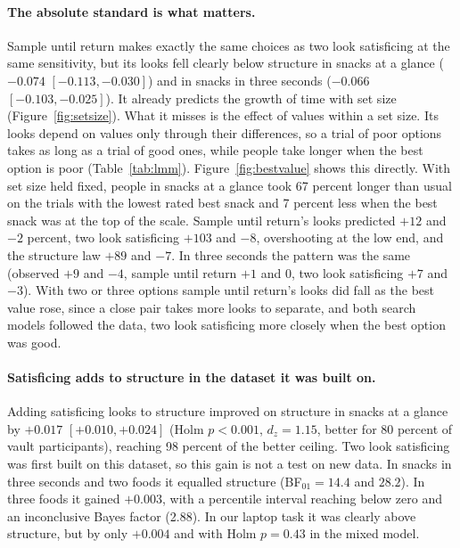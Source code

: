 \documentclass[11pt]{article}
\begin{document}
\paragraph{The absolute standard is what matters.} Sample until return makes exactly the same choices as two look satisficing at the same sensitivity, but its looks fell clearly below structure in snacks at a glance ($-0.074$ $[-0.113, -0.030]$) and in snacks in three seconds ($-0.066$ $[-0.103, -0.025]$). It already predicts the growth of time with set size (Figure~\ref{fig:setsize}). What it misses is the effect of values within a set size. Its looks depend on values only through their differences, so a trial of poor options takes as long as a trial of good ones, while people take longer when the best option is poor (Table~\ref{tab:lmm}). Figure~\ref{fig:bestvalue} shows this directly. With set size held fixed, people in snacks at a glance took 67 percent longer than usual on the trials with the lowest rated best snack and 7 percent less when the best snack was at the top of the scale. Sample until return's looks predicted $+12$ and $-2$ percent, two look satisficing $+103$ and $-8$, overshooting at the low end, and the structure law $+89$ and $-7$. In three seconds the pattern was the same (observed $+9$ and $-4$, sample until return $+1$ and $0$, two look satisficing $+7$ and $-3$). With two or three options sample until return's looks did fall as the best value rose, since a close pair takes more looks to separate, and both search models followed the data, two look satisficing more closely when the best option was good.

\paragraph{Satisficing adds to structure in the dataset it was built on.} Adding satisficing looks to structure improved on structure in snacks at a glance by $+0.017$ $[+0.010, +0.024]$ (Holm $p < 0.001$, $d_z = 1.15$, better for 80 percent of vault participants), reaching 98 percent of the better ceiling. Two look satisficing was first built on this dataset, so this gain is not a test on new data. In snacks in three seconds and two foods it equalled structure (BF$_{01} = 14.4$ and $28.2$). In three foods it gained $+0.003$, with a percentile interval reaching below zero and an inconclusive Bayes factor (2.88). In our laptop task it was clearly above structure, but by only $+0.004$ and with Holm $p = 0.43$ in the mixed model.
\end{document}
